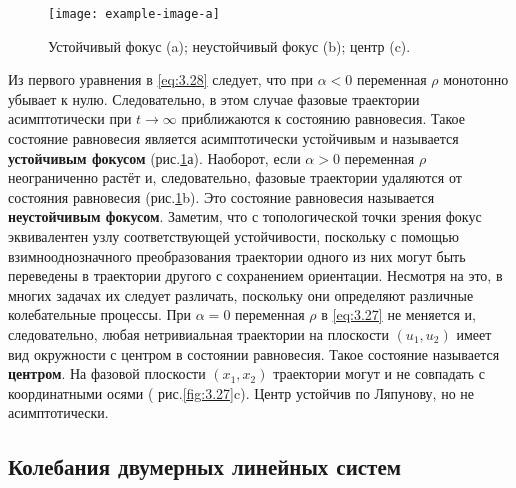 \begin{figure}[h!]
        \centering
        \texttt{[image: example-image-a]}
        \label{fig:3.7}
        \caption{Устойчивый фокус (a); неустойчивый фокус (b); центр (c).}
\end{figure}
Из первого уравнения в \eqref{eq:3.28} следует, что при $ \alpha < 0$ переменная $\rho$ монотонно убывает к нулю. Следовательно, в этом случае фазовые траектории асимптотически при $t \to \infty$ приближаются к состоянию равновесия. Такое состояние равновесия является асимптотически устойчивым и называется \textbf{ устойчивым фокусом} (рис.\ref{fig:3.7}а). Наоборот, 
если $ \alpha > 0 $ переменная $\rho$ неограниченно растёт и, следовательно, фазовые траектории удаляются от состояния равновесия (рис.\ref{fig:3.7}b).  Это состояние равновесия называется \textbf{неустойчивым фокусом}.
Заметим, что с топологической точки зрения фокус эквивалентен узлу соответствующей устойчивости, поскольку с помощью взимнооднозначного преобразования траектории одного из них могут быть переведены в траектории другого с сохранением ориентации. Несмотря на это, в многих задачах их следует различать, поскольку они определяют различные колебательные процессы. При $\alpha = 0$ переменная $\rho$ в \eqref{eq:3.27}  не меняется и, следовательно, любая нетривиальная траектории на плоскости $(u_1, u_2)$ имеет вид окружности с центром в состоянии равновесия. Такое состояние называется \textbf{центром}. На фазовой плоскости $(x_1,x_2)$ траектории могут и не совпадать с координатными осями ( рис.\ref{fig:3.27}c). Центр устойчив по Ляпунову, но не асимптотически.

\subsection{Колебания двумерных линейных систем}%
\label{ssub:3.2.3}


